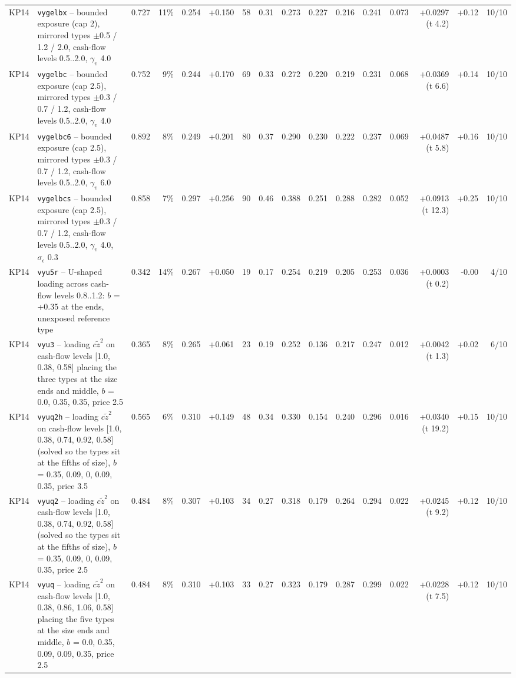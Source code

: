 \begin{landscape}
\begin{longtable}{lp{4.6cm}rrrrrrrrrrrrrr}
KP14 & \texttt{vygelbx} -- bounded exposure (cap 2), mirrored types $\pm$0.5 / 1.2 / 2.0, cash-flow levels 0.5..2.0, $\gamma_v$ 4.0 & 0.727 & 11\% & 0.254 & +0.150 & 58 & 0.31 & 0.273 & 0.227 & 0.216 & 0.241 & 0.073 & +0.0297 (t 4.2) & +0.12 & 10/10 \\
KP14 & \texttt{vygelbc} -- bounded exposure (cap 2.5), mirrored types $\pm$0.3 / 0.7 / 1.2, cash-flow levels 0.5..2.0, $\gamma_v$ 4.0 & 0.752 & 9\% & 0.244 & +0.170 & 69 & 0.33 & 0.272 & 0.220 & 0.219 & 0.231 & 0.068 & +0.0369 (t 6.6) & +0.14 & 10/10 \\
KP14 & \texttt{vygelbc6} -- bounded exposure (cap 2.5), mirrored types $\pm$0.3 / 0.7 / 1.2, cash-flow levels 0.5..2.0, $\gamma_v$ 6.0 & 0.892 & 8\% & 0.249 & +0.201 & 80 & 0.37 & 0.290 & 0.230 & 0.222 & 0.237 & 0.069 & +0.0487 (t 5.8) & +0.16 & 10/10 \\
KP14 & \texttt{vygelbcs} -- bounded exposure (cap 2.5), mirrored types $\pm$0.3 / 0.7 / 1.2, cash-flow levels 0.5..2.0, $\gamma_v$ 4.0, $\sigma_\epsilon$ 0.3 & 0.858 & 7\% & 0.297 & +0.256 & 90 & 0.46 & 0.388 & 0.251 & 0.288 & 0.282 & 0.052 & +0.0913 (t 12.3) & +0.25 & 10/10 \\
KP14 & \texttt{vyu5r} -- U-shaped loading across cash-flow levels 0.8..1.2: $b$ = +0.35 at the ends, unexposed reference type & 0.342 & 14\% & 0.267 & +0.050 & 19 & 0.17 & 0.254 & 0.219 & 0.205 & 0.253 & 0.036 & +0.0003 (t 0.2) & -0.00 & 4/10 \\
KP14 & \texttt{vyu3} -- loading $c\tilde z^2$ on cash-flow levels [1.0, 0.38, 0.58] placing the three types at the size ends and middle, $b$ = 0.0, 0.35, 0.35, price 2.5 & 0.365 & 8\% & 0.265 & +0.061 & 23 & 0.19 & 0.252 & 0.136 & 0.217 & 0.247 & 0.012 & +0.0042 (t 1.3) & +0.02 & 6/10 \\
KP14 & \texttt{vyuq2h} -- loading $c\tilde z^2$ on cash-flow levels [1.0, 0.38, 0.74, 0.92, 0.58] (solved so the types sit at the fifths of size), $b$ = 0.35, 0.09, 0, 0.09, 0.35, price 3.5 & 0.565 & 6\% & 0.310 & +0.149 & 48 & 0.34 & 0.330 & 0.154 & 0.240 & 0.296 & 0.016 & +0.0340 (t 19.2) & +0.15 & 10/10 \\
KP14 & \texttt{vyuq2} -- loading $c\tilde z^2$ on cash-flow levels [1.0, 0.38, 0.74, 0.92, 0.58] (solved so the types sit at the fifths of size), $b$ = 0.35, 0.09, 0, 0.09, 0.35, price 2.5 & 0.484 & 8\% & 0.307 & +0.103 & 34 & 0.27 & 0.318 & 0.179 & 0.264 & 0.294 & 0.022 & +0.0245 (t 9.2) & +0.12 & 10/10 \\
KP14 & \texttt{vyuq} -- loading $c\tilde z^2$ on cash-flow levels [1.0, 0.38, 0.86, 1.06, 0.58] placing the five types at the size ends and middle, $b$ = 0.0, 0.35, 0.09, 0.09, 0.35, price 2.5 & 0.484 & 8\% & 0.310 & +0.103 & 33 & 0.27 & 0.323 & 0.179 & 0.287 & 0.299 & 0.022 & +0.0228 (t 7.5) & +0.12 & 10/10 \\

\end{longtable}
\end{landscape}
